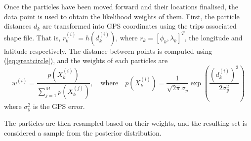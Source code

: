 \documentclass[10pt,a4paper]{article}
\begin{document}
Once the particles have been moved forward and their locations finalised, the data point is used to 
obtain the likelihood weights of them.
First, the particle distances $d_k$ are transformed into GPS coordinates using the trips associated 
shape file. 
That is, $r_k^{(i)} = h(d_k^{(i)})$, where $r_k = [\phi_k, \lambda_k]^T$, the longitude and latitude
respectively.
The distance between points is computed using (\ref{eq:greatcircle}), 
and the weights of each particles are
\begin{equation}
  \label{eq:particle_weights}
  w^{(i)} = \frac{p(X_k^{(i)})}{\sum_{j=1}^M p(X_k^{(j)})},\quad \text{where}\quad
  p(X_k^{(i)}) = \frac{1}{\sqrt{2\pi}\sigma_y} \exp\left(\frac{(d_k^{(i)})^2}{2\sigma_y^2}\right)
\end{equation}
where $\sigma_y^2$ is the GPS error.

The particles are then resampled based on their weights, and the resulting set is considered
a sample from the posterior distribution.
\end{document}
